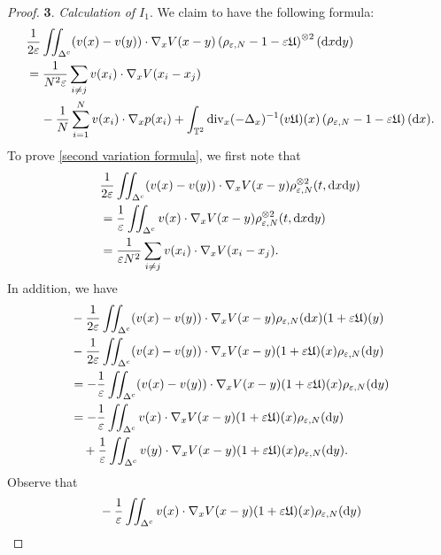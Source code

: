 \documentclass[11pt,reqno]{amsart}
\numberwithin{equation}{section}
\def\dd{{\rm d}}
\begin{document}
\begin{proof}
\smallskip
\textbf{3}. \textit{Calculation of $I_{1}$}. We claim to have the following formula: 
\begin{align}
&\frac{1}{2\varepsilon}\iint_{\Delta^{c}}(v(x)-v(y))\cdot \nabla_{x} V(x-y)\left(\rho_{\varepsilon,N}-1-\varepsilon \mathfrak{U}\right)^{\otimes 2}(\dd x\dd y) \notag\\
&=\frac{1}{N^{2}\varepsilon}\sum_{i\neq j}v(x_{i}) \cdot \nabla_{x} V(x_{i}-x_{j}) \notag\\
&\quad\,-\frac{1}{N}\sum_{i=1}^{N}v(x_{i})\cdot \nabla_{x} p(x_{i})+\int_{\mathbb{T}^{2}} \mathrm{div}_{x} (-\Delta_{x} )^{-1}(v\mathfrak{U})(x)\left(\rho_{\varepsilon,N}-1-\varepsilon \mathfrak{U}\right)(\dd x). \label{second variation formula} 
\end{align}
To prove \eqref{second variation formula}, we first note that 
\begin{align}
&\frac{1}{2\varepsilon}\iint_{\Delta^{c}}(v(x)-v(y))\cdot \nabla_{x}V(x-y)\rho_{\varepsilon,N}^{\otimes 2}(t,\dd x\dd y)\notag\\
&=\frac{1}{\varepsilon}\iint_{\Delta^{c}}v(x)\cdot \nabla_{x}V(x-y)\rho_{\varepsilon,N}^{\otimes 2}(t,\dd x\dd y) \notag\\
&=\frac{1}{\varepsilon N^{2}}\sum_{i\neq j}v(x_{i})\cdot \nabla_{x}V(x_{i}-x_{j}).    \label{pure product} 
\end{align}
In addition, we have 
\begin{align*}
&-\frac{1}{2\varepsilon}\iint_{\Delta^{c}}(v(x)-v(y))\cdot \nabla_{x}V(x-y)\rho_{\varepsilon,N}(\dd x)(1+\varepsilon \mathfrak{U})( y)\\
&-\frac{1}{2\varepsilon}\iint_{\Delta^{c}}(v(x)-v(y))\cdot \nabla_{x}V(x-y)(1+\varepsilon\mathfrak{U})(x)\rho_{\varepsilon,N}(\dd y)\\
&= -\frac{1}{\varepsilon}\iint_{\Delta^{c}}(v(x)-v(y))\cdot \nabla_{x}V(x-y)(1+\varepsilon \mathfrak{U})(x)\rho_{\varepsilon,N}(\dd y)\\
&=-\frac{1}{\varepsilon}\iint_{\Delta^{c}}v(x)\cdot \nabla_{x} V(x-y)(1+\varepsilon \mathfrak{U})(x)\rho_{\varepsilon,N}(\dd y)\nonumber\\
&\quad+\frac{1}{\varepsilon}\iint_{\Delta^{c}}v(y)\cdot \nabla_{x}V(x-y)(1+\varepsilon\mathfrak{U})(x)\rho_{\varepsilon,N}(\dd y).     
\end{align*}
Observe that 
\begin{align*}
&-\frac{1}{\varepsilon}\iint_{\Delta^{c}}v(x)\cdot \nabla_{x}V(x-y) (1+\varepsilon \mathfrak{U})(x)\rho_{\varepsilon,N}(\dd y)\\

\end{align*}
\end{proof}
\end{document}
